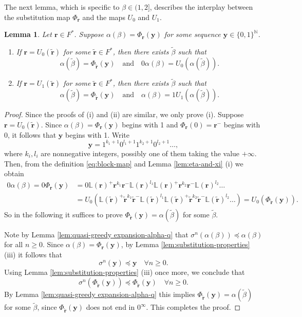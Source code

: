\documentclass[11pt]{amsart}
\newtheorem{lemma}[theorem]{Lemma}
\theoremstyle{definition}
\theoremstyle{remark}
\numberwithin{equation}{section}
\newcommand{\N}{\ensuremath{\mathbb{N}}}
\renewcommand{\L}{\ensuremath{\mathbb{L}}}
\newcommand{\F}{F^*}
\renewcommand{\r}{ {\mathbf{r}}}
\newcommand{\y}{\mathbf{y}}
\newcommand{\f}{\infty}
\newcommand{\al}{\alpha}
\newcommand{\lle}{\preccurlyeq}
\newcommand{\si}{\sigma}
\begin{document}
The next lemma, {which is specific to $\beta\in(1,2]$,} describes the interplay between the substitution map $\Phi_\r$ and the maps $U_0$ and $U_1$.

{%

\begin{lemma}  \label{lem:substitution-commute-c}
  Let $\r\in\F$. Suppose $\alpha(\beta)=\Phi_\r(\y)$ for some sequence $\y\in\{0,1\}^\N$. 
  \begin{enumerate}[{\rm(i)}]
    \item If $\r=U_0(\tilde{\r})$ for some $\tilde{\r}\in\F$, then there exists $\tilde\beta$ such that 
    \[
    \alpha(\tilde{\beta})=\Phi_{\tilde{\r}}(\y)\quad \textrm{and}\quad 0\alpha(\beta)=U_0(\alpha(\tilde{\beta})).
    \]
    \item If $\r=U_1(\tilde{\r})$ for some $\tilde{\r}\in\F$,  then there exists $\tilde\beta$ such that 
    \[
    \alpha(\tilde{\beta})=\Phi_{\tilde{\r}}(\y)\quad \textrm{and}\quad  \alpha(\beta)=1U_1(\alpha(\tilde{\beta})).
    \]
  \end{enumerate}
\end{lemma}

\begin{proof}
Since the proofs of (i) and (ii) are similar, we only prove (i).
  Suppose   $\r=U_0(\tilde{\r})$. Since $\alpha(\beta)=\Phi_\r(\y)$ begins with 1 and $\Phi_\r(0)=\r^-$ begins with 0, it follows that $\y$ begins with 1. Write \[
\mathbf y=1^{k_1+1}0^{l_1+1}1^{k_2+1}0^{l_2+1}\ldots,
\]
where $k_i, l_i$ are nonnegative integers, possibly one of them taking the value $+\infty$. Then, from   the definition \eqref{eq:block-map} and Lemma \ref{lem:eta-and-xi} (i) we obtain
\begin{align*}
0\alpha(\beta)=0\Phi_\r(\y)&=0\L(\r)^+\r^{k_1}\r^-\L(\r)^{l_1}\L(\r)^+\r^{k_2}\r^-\L(\r)^{l_2}\dots\\
&=U_0(\L(\tilde\r)^+\tilde\r^{k_1}\tilde\r^-\L(\tilde\r)^{l_1}\L(\tilde\r)^+\tilde\r^{k_2}\tilde\r^-\L(\tilde\r)^{l_2}\dots)=U_0(\Phi_{\tilde\r}(\y)).
\end{align*}
So in the following it suffices to prove $\Phi_{\tilde\r}(\y)=\al(\tilde\beta)$ for some $\tilde\beta$. 

Note by Lemma \ref{lem:quasi-greedy expansion-alpha-q} that $\si^n(\al(\beta))\lle \al(\beta)$ for all $n\ge 0$. Since $\al(\beta)=\Phi_\r(\y)$, by Lemma \ref{lem:substitution-properties} (iii) it follows that 
\[
\si^n(\y)\lle \y\quad\forall n\ge 0.
\]
Using Lemma \ref{lem:substitution-properties} (iii) once more, we conclude that 
\[
\si^n(\Phi_{\tilde \r}(\y))\lle \Phi_{\tilde\r}(\y)\quad \forall n\ge 0.
\]
By Lemma \ref{lem:quasi-greedy expansion-alpha-q} this implies $\Phi_{\tilde\r}(\y)=\al(\tilde\beta)$ for some $\tilde\beta$, since $\Phi_{\tilde\r}(\y)$ does not end in $0^\f$. This completes the proof.
\end{proof}
}
\end{document}
